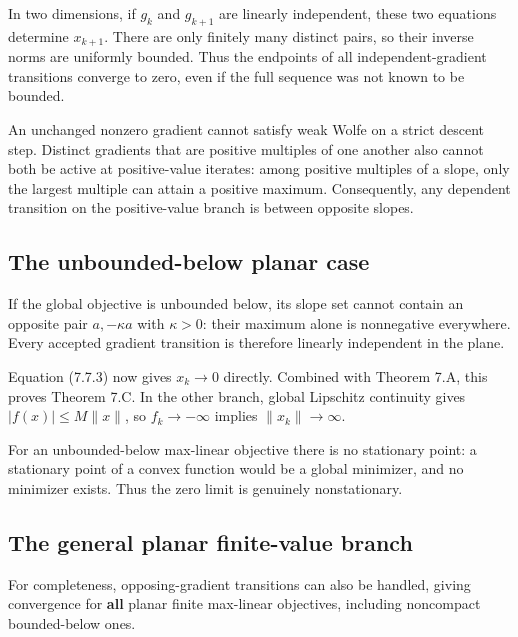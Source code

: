In two dimensions, if \(g_k\) and \(g_{k+1}\) are linearly independent,
these two equations determine \(x_{k+1}\). There are only finitely many
distinct pairs, so their inverse norms are uniformly bounded. Thus the
endpoints of all independent-gradient transitions converge to zero, even
if the full sequence was not known to be bounded.

An unchanged nonzero gradient cannot satisfy weak Wolfe on a strict
descent step. Distinct gradients that are positive multiples of one
another also cannot both be active at positive-value iterates: among
positive multiples of a slope, only the largest multiple can attain a
positive maximum. Consequently, any dependent transition on the
positive-value branch is between opposite slopes.



\subsection{The unbounded-below planar
case}\label{H:the-unbounded-below-planar-case}

If the global objective is unbounded below, its slope set cannot contain
an opposite pair \(a,-\kappa a\) with \(\kappa>0\): their maximum alone
is nonnegative everywhere. Every accepted gradient transition is
therefore linearly independent in the plane.

Equation (7.7.3) now gives \(x_k\to0\) directly. Combined with Theorem 7.A,
this proves Theorem 7.C. In the other branch, global Lipschitz continuity
gives \(|f(x)|\le M\|x\|\), so \(f_k\to-\infty\) implies
\(\|x_k\|\to\infty\).

For an unbounded-below max-linear objective there is no stationary
point: a stationary point of a convex function would be a global
minimizer, and no minimizer exists. Thus the zero limit is genuinely
nonstationary.



\subsection{The general planar finite-value
branch}\label{H:the-general-planar-finite-value-branch}

For completeness, opposing-gradient transitions can also be handled,
giving convergence for \textbf{all} planar finite max-linear objectives,
including noncompact bounded-below ones.

